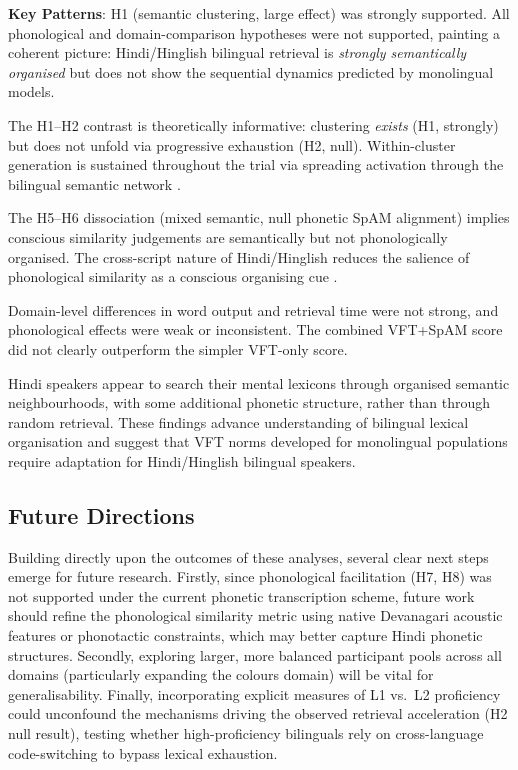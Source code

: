 \documentclass[12pt]{article}
\begin{document}
\textbf{Key Patterns}: H1 (semantic clustering, large effect) was strongly supported. All phonological and domain-comparison hypotheses were not supported, painting a coherent picture: Hindi/Hinglish bilingual retrieval is \textit{strongly semantically organised} but does not show the sequential dynamics predicted by monolingual models.

The H1--H2 contrast is theoretically informative: clustering \textit{exists} (H1, strongly) but does not unfold via progressive exhaustion (H2, null). Within-cluster generation is sustained throughout the trial via spreading activation through the bilingual semantic network \citep{hills2012}.

The H5--H6 dissociation (mixed semantic, null phonetic SpAM alignment) implies conscious similarity judgements are semantically but not phonologically organised. The cross-script nature of Hindi/Hinglish reduces the salience of phonological similarity as a conscious organising cue \citep{dautriche2016}.

Domain-level differences in word output and retrieval time were not strong, and phonological effects were weak or inconsistent. The combined VFT+SpAM score did not clearly outperform the simpler VFT-only score.

Hindi speakers appear to search their mental lexicons through organised semantic neighbourhoods, with some additional phonetic structure, rather than through random retrieval. These findings advance understanding of bilingual lexical organisation and suggest that VFT norms developed for monolingual populations require adaptation for Hindi/Hinglish bilingual speakers.

\subsection*{Future Directions}

Building directly upon the outcomes of these analyses, several clear next steps emerge for future research. Firstly, since phonological facilitation (H7, H8) was not supported under the current phonetic transcription scheme, future work should refine the phonological similarity metric using native Devanagari acoustic features or phonotactic constraints, which may better capture Hindi phonetic structures. Secondly, exploring larger, more balanced participant pools across all domains (particularly expanding the colours domain) will be vital for generalisability. Finally, incorporating explicit measures of L1 vs.\ L2 proficiency could unconfound the mechanisms driving the observed retrieval acceleration (H2 null result), testing whether high-proficiency bilinguals rely on cross-language code-switching to bypass lexical exhaustion.
\end{document}
